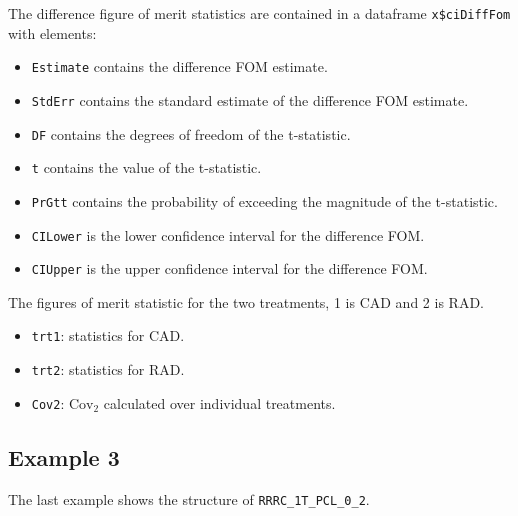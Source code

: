 \documentclass[
]{book}
\providecommand{\tightlist}{%
  \setlength{\itemsep}{0pt}\setlength{\parskip}{0pt}}
\begin{document}
The difference figure of merit statistics are contained in a dataframe \texttt{x\$ciDiffFom} with elements:

\begin{itemize}
\tightlist
\item
  \texttt{Estimate} contains the difference FOM estimate.
\item
  \texttt{StdErr} contains the standard estimate of the difference FOM estimate.
\item
  \texttt{DF} contains the degrees of freedom of the t-statistic.
\item
  \texttt{t} contains the value of the t-statistic.
\item
  \texttt{PrGtt} contains the probability of exceeding the magnitude of the t-statistic.
\item
  \texttt{CILower} is the lower confidence interval for the difference FOM.
\item
  \texttt{CIUpper} is the upper confidence interval for the difference FOM.
\end{itemize}

The figures of merit statistic for the two treatments, 1 is CAD and 2 is RAD.

\begin{itemize}
\tightlist
\item
  \texttt{trt1}: statistics for CAD.
\item
  \texttt{trt2}: statistics for RAD.
\item
  \texttt{Cov2}: \(\text{Cov}_2\) calculated over individual treatments.
\end{itemize}

\hypertarget{example-3}{%
\subsection{Example 3}\label{example-3}}

The last example shows the structure of \texttt{RRRC\_1T\_PCL\_0\_2}.
\end{document}
